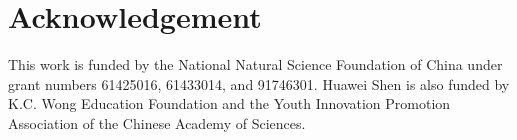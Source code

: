 \documentclass[runningheads]{llncs}
\begin{document}
\section*{Acknowledgement}
This work is funded by the National Natural Science Foundation of China under grant numbers 61425016, 61433014, and 91746301. Huawei Shen is also funded by K.C. Wong Education Foundation and the Youth Innovation Promotion Association of the Chinese Academy of Sciences.



\end{document}
